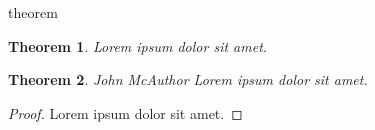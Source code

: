 \newtheorem{theorem}{Theorem}{theorem}
\newtheorem{proof}{Proof}

\begin{theorem}
Lorem ipsum dolor sit amet.
\end{theorem}

\begin{theorem}{John McAuthor}
Lorem ipsum dolor sit amet.
\end{theorem}

\begin{proof}
Lorem ipsum dolor sit amet. 
\end{proof}

